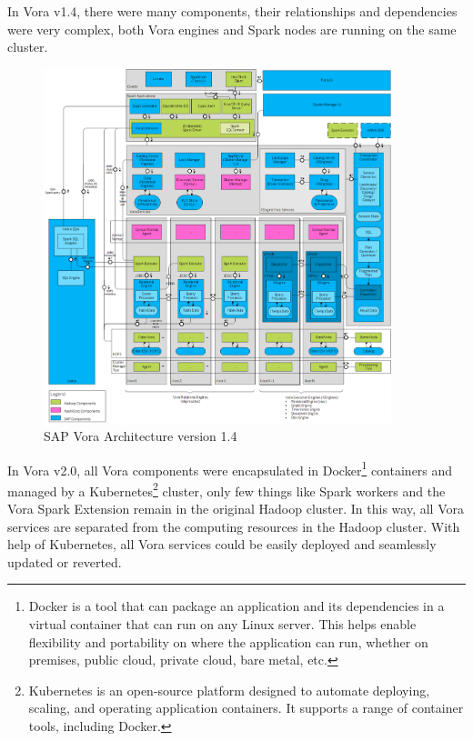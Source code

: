 \documentclass[article,colorback,accentcolor=tud4c]{tudreport}
\begin{document}
In Vora v1.4, there were many components, their relationships and dependencies were very complex, both Vora engines and Spark nodes are running on the same cluster.

\begin{figure}[!h]
	\centering
	\includegraphics[width=0.9\textwidth]{vora14}
	\caption{SAP Vora Architecture version 1.4\cite{vora 1.4 architecture}}
\end{figure}

In Vora v2.0, all Vora components were encapsulated in Docker\footnote{Docker is a tool that can package an application and its dependencies in a virtual container that can run on any Linux server. This helps enable flexibility and portability on where the application can run, whether on premises, public cloud, private cloud, bare metal, etc.} containers and managed by a Kubernetes\footnote{Kubernetes is an open-source platform designed to automate deploying, scaling, and operating application containers. It supports a range of container tools, including Docker.} cluster, only few things like Spark workers and the Vora Spark Extension remain in the original Hadoop cluster. In this way, all Vora services are separated from the computing resources in the Hadoop cluster. With help of Kubernetes, all Vora services could be easily deployed and seamlessly updated or reverted.
\end{document}
